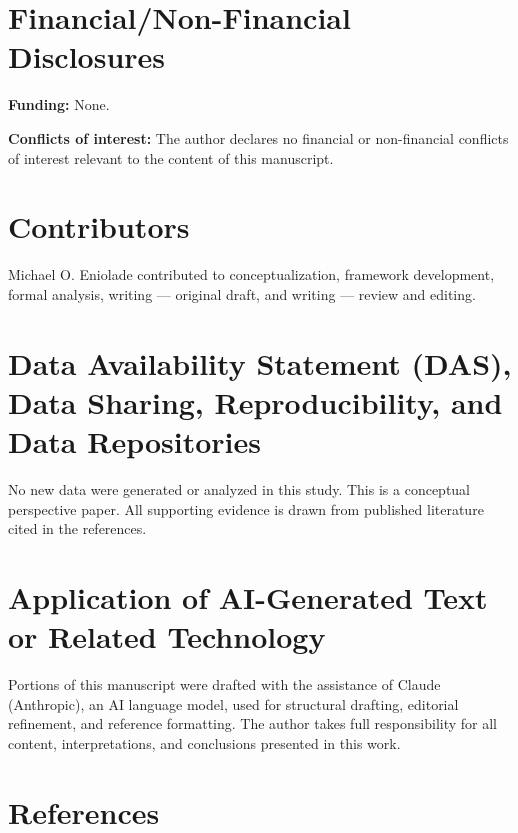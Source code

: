 \documentclass[12pt,a4paper]{article}
\begin{document}
\section*{Financial/Non-Financial Disclosures}
\textbf{Funding:} None.

\textbf{Conflicts of interest:} The author declares no financial
or non-financial conflicts of interest relevant to the content of
this manuscript.

\section*{Contributors}
Michael O. Eniolade contributed to conceptualization, framework
development, formal analysis, writing --- original draft, and
writing --- review and editing.

\section*{Data Availability Statement (DAS), Data Sharing,
Reproducibility, and Data Repositories}
No new data were generated or analyzed in this study. This is a
conceptual perspective paper. All supporting evidence is drawn
from published literature cited in the references.

\section*{Application of AI-Generated Text or Related Technology}
Portions of this manuscript were drafted with the assistance of
Claude (Anthropic), an AI language model, used for structural
drafting, editorial refinement, and reference formatting. The
author takes full responsibility for all content, interpretations,
and conclusions presented in this work.

\section*{References}
\end{document}
